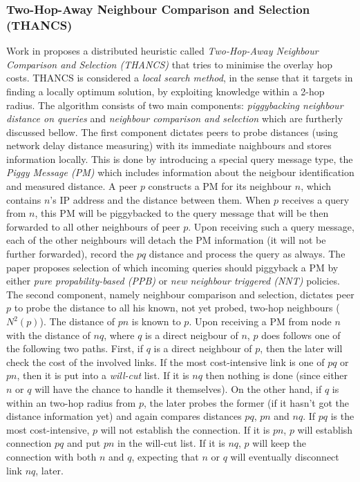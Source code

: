 \subsubsection{Two-Hop-Away Neighbour Comparison and Selection (THANCS)}
Work in \cite{LNXE2005,L2008} proposes a distributed heuristic
called \emph{Two-Hop-Away Neighbour Comparison and Selection (THANCS)} that
tries to minimise the overlay hop costs. THANCS is considered a \emph{local
search method}, in the sense that it targets in finding a locally optimum
solution, by exploiting knowledge within a 2-hop radius. The algorithm consists
of two main components: \emph{piggybacking neighbour distance on queries} and
\emph{neighbour comparison and selection} which are furtherly discussed bellow.
The first component dictates peers to probe distances (using network delay
distance measuring) with its immediate naighbours and stores information
locally. This is done by introducing a special query message type, the
\emph{Piggy Message (PM)} which includes information about the neigbour
identification and measured distance. A peer $p$ constructs a PM for its
neighbour $n$, which contains $n$'s IP address and the distance between them.
When $p$ receives a query from $n$, this PM will be piggybacked to the query
message that will be then forwarded to all other neighbours of peer $p$. Upon
receiving such a query message, each of the other neighbours will detach the PM
information (it will not be further forwarded), record the $pq$ distance and
process the query as always. The paper proposes selection of which incoming
queries should piggyback a PM by either \emph{pure propability-based (PPB)} or
\emph{new neighbour triggered (NNT)} policies. The second component, namely
neighbour comparison and selection, dictates peer $p$ to probe the distance to
all his known, not yet probed, two-hop neighbours ($ N^2(p)$). The distance of
$pn$ is known to $p$. Upon receiving a PM from node $n$ with the distance of
$nq$, where $q$ is a direct neigbour of $n$, $p$ does follows one of the
following two paths. First, if $q$ is a direct neighbour of $p$, then the later
will check the cost of the involved links. If the most cost-intensive link is
one of $pq$ or $pn$, then it is put into a \emph{will-cut} list. If it is $nq$
then nothing is done (since either $n$ or $q$ will have the chance to handle it
themselves). On the other hand, if $q$ is within an two-hop radius from $p$,
the later probes the former (if it hasn't got the distance information yet) and
again compares distances $pq$, $pn$ and $nq$. If $pq$ is the most
cost-intensive, $p$ will not establish the connection. If it is $pn$, $p$ will
establish connection $pq$ and put $pn$ in the will-cut list. If it is $nq$, $p$
will keep the connection with both $n$ and $q$, expecting that $n$ or $q$ will
eventually disconnect link $nq$, later.


